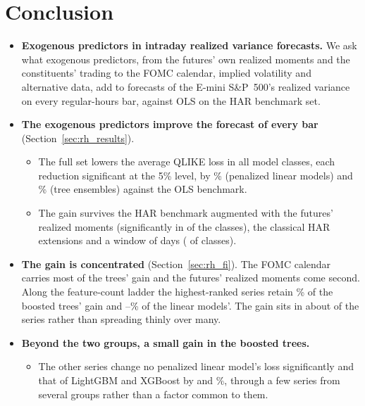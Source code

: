 

\section{Conclusion}
\label{sec:rh_conclusion}
\begin{itemize}
\item \textbf{Exogenous predictors in intraday realized variance forecasts.} We ask what exogenous predictors, from
  the futures' own realized moments and the constituents' trading to the FOMC calendar, implied volatility and
  alternative data, add to forecasts of the E-mini S\&P~500's realized variance on every regular-hours bar,
  against OLS on the HAR benchmark set.
\item \textbf{The exogenous predictors improve the forecast of every bar} (Section~\ref{sec:rh_results}).
  \begin{itemize}
  \item The full set lowers the average QLIKE loss in all \rhorAfPairs{} model classes, each reduction significant at
    the 5\% level, by \rhorVsOlsRedLinRng{}\% (penalized linear models) and \rhorVsOlsRedTreeRng{}\%
    (tree ensembles) against the OLS benchmark.
  \item The gain survives the HAR benchmark augmented with the futures' realized moments (significantly in
    \rhabNClassesBeatAddRm{} of the \rhabNClassesAddRm{} classes), the classical HAR extensions and a window of
    \rhrbWinLong{} days (\rhrbNFullLowerSigBarLong{} of \rhrbNModelsLong{} classes).
  \end{itemize}
\item \textbf{The gain is concentrated} (Section~\ref{sec:rh_fi}). The FOMC calendar
  carries most of the trees' gain and the futures' realized moments come second. Along the feature-count ladder the
  \ladderEBTopK{} highest-ranked series retain \ladderEBTreeRetainRng{}\% of the boosted trees' gain and
  \rhldEBLinRTenMin{}--\rhldEBLinRTenMax{}\% of the linear models'. The gain sits in about \ladderEBTopK{} of the
  \rhldEBNSeries{} series rather than spreading thinly over many.
\item \textbf{Beyond the two groups, a small gain in the boosted trees.}
  \begin{itemize}
  \item The other \rhbyFLNSeries{} series change no penalized linear model's loss significantly and that of
    LightGBM and XGBoost by \rhabLgbmFullVsAddRmFomcAllPct{} and \rhabXgbFullVsAddRmFomcAllPct\%, through a few
    series from several groups rather than a factor common to them.

\end{itemize}
\end{itemize}
